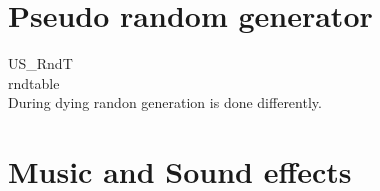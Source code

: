 
\section{Pseudo random generator}
US\_RndT\\
rndtable\\
During dying randon generation is done differently.



\section{Music and Sound effects} 

